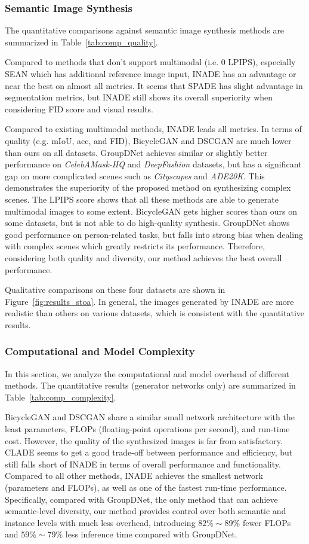\documentclass[final]{cvpr}
\begin{document}
\subsubsection{Semantic Image Synthesis}
The quantitative comparisons against semantic image synthesis methods are summarized in Table~\ref{tab:comp_quality}.

Compared to methods that don't support multimodal (i.e. 0 LPIPS), especially SEAN which has additional reference image input, INADE has an advantage or near the best on almost all metrics. It seems that SPADE has slight advantage in segmentation metrics, but INADE still shows its overall superiority when considering FID score and visual results.

Compared to existing multimodal methods, INADE leads all metrics. In terms of quality (e.g. mIoU, acc, and FID), BicycleGAN and DSCGAN are much lower than ours on all datasets. GroupDNet achieves similar or slightly better performance on \textit{CelebAMask-HQ} and \textit{DeepFashion} datasets, but has a significant gap on more complicated scenes such as \textit{Cityscapes} and \textit{ADE20K}. This demonstrates the superiority of the proposed method on synthesizing complex scenes. The LPIPS score shows that all these methods are able to generate multimodal images to some extent. 
BicycleGAN gets higher scores than ours on some datasets, but is not able to do high-quality synthesis.
GroupDNet shows good performance on person-related tasks, but falls into strong bias when dealing with complex scenes which greatly restricts its performance. Therefore, considering both quality and diversity, our method achieves the best overall performance.

Qualitative comparisons on these four datasets are shown in Figure~\ref{fig:results_stoa}. In general, the images generated by INADE are more realistic than others on various datasets, which is consistent with the quantitative results.

\subsubsection{Computational and Model Complexity}
In this section, we analyze the computational and model overhead of different methods. The quantitative results (generator networks only) are summarized in Table~\ref{tab:comp_complexity}.

BicycleGAN and DSCGAN share a similar small network architecture with the least parameters, FLOPs (floating-point operations per second), and run-time cost. However, the quality of the synthesized images is far from satisfactory. CLADE seems to get a good trade-off between performance and efficiency, but still falls short of INADE in terms of overall performance and functionality.
Compared to all other methods, INADE achieves the smallest network (parameters and FLOPs), as well as one of the fastest run-time performance.
Specifically, compared with GroupDNet, the only method that can achieve semantic-level diversity, our method provides control over both semantic and instance levels with much less overhead, introducing $82\%\sim89\%$ fewer FLOPs and $59\%\sim79\%$ less inference time compared with GroupDNet.
\end{document}
